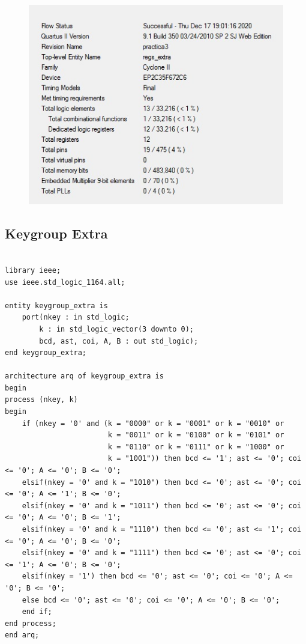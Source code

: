 \documentclass[12pt, a4papre]{article}
\begin{document}
					\begin{figure}[H]
		\begin{center}
		\includegraphics[width=130mm]{informeRegsExtra.jpeg}
		\end{center}
	\end{figure}	
	
			
			

\subsection{Keygroup Extra}


	\begin{lstlisting}[style=vhdl, frame=single, basicstyle=\tiny]

library ieee;
use ieee.std_logic_1164.all;

entity keygroup_extra is
	port(nkey : in std_logic;
		k : in std_logic_vector(3 downto 0);
		bcd, ast, coi, A, B : out std_logic);
end keygroup_extra;

architecture arq of keygroup_extra is
begin
process (nkey, k)
begin
	if (nkey = '0' and (k = "0000" or k = "0001" or k = "0010" or
						k = "0011" or k = "0100" or k = "0101" or
						k = "0110" or k = "0111" or k = "1000" or
						k = "1001")) then bcd <= '1'; ast <= '0'; coi <= '0'; A <= '0'; B <= '0';
	elsif(nkey = '0' and k = "1010") then bcd <= '0'; ast <= '0'; coi <= '0'; A <= '1'; B <= '0';
	elsif(nkey = '0' and k = "1011") then bcd <= '0'; ast <= '0'; coi <= '0'; A <= '0'; B <= '1';
	elsif(nkey = '0' and k = "1110") then bcd <= '0'; ast <= '1'; coi <= '0'; A <= '0'; B <= '0';
	elsif(nkey = '0' and k = "1111") then bcd <= '0'; ast <= '0'; coi <= '1'; A <= '0'; B <= '0';
	elsif(nkey = '1') then bcd <= '0'; ast <= '0'; coi <= '0'; A <= '0'; B <= '0';
	else bcd <= '0'; ast <= '0'; coi <= '0'; A <= '0'; B <= '0';
	end if;
end process;
end arq;


			\end{lstlisting}
			
\end{document}
